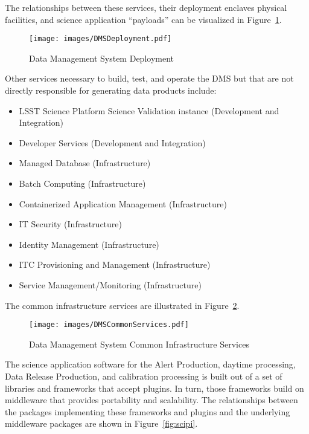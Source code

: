 \documentclass[DM,toc,lsstdraft]{lsstdoc}
\begin{document}
The relationships between these services, their deployment enclaves
physical facilities, and science application ``payloads'' can be
visualized in Figure~\ref{fig:deployment}.

\begin{figure}
\centering
\texttt{[image: images/DMSDeployment.pdf]}
\caption{Data Management System Deployment}
\label{fig:deployment}
\end{figure}

Other services necessary to build, test, and operate the DMS but that are not directly responsible for generating data products include:
\begin{itemize}
\item
  LSST Science Platform Science Validation instance (Development and Integration)
\item
  Developer Services (Development and Integration)
\item
  Managed Database (Infrastructure)
\item
  Batch Computing (Infrastructure)
\item
  Containerized Application Management (Infrastructure)
\item
  IT Security (Infrastructure)
\item
  Identity Management (Infrastructure)
\item
  ITC Provisioning and Management (Infrastructure)
\item
  Service Management/Monitoring (Infrastructure)
\end{itemize}

The common infrastructure services are illustrated in Figure~\ref{fig:commonservices}.

\begin{figure}
\centering
\texttt{[image: images/DMSCommonServices.pdf]}
\caption{Data Management System Common Infrastructure Services}
\label{fig:commonservices}
\end{figure}

The science application software for the Alert Production, daytime
processing, Data Release Production, and calibration processing is built
out of a set of libraries and frameworks that accept plugins. In turn, those
frameworks build on middleware that provides portability and
scalability.  The relationships between the packages implementing
these frameworks and plugins and the underlying middleware packages
are shown in Figure~\ref{fig:scipi}.
\end{document}
